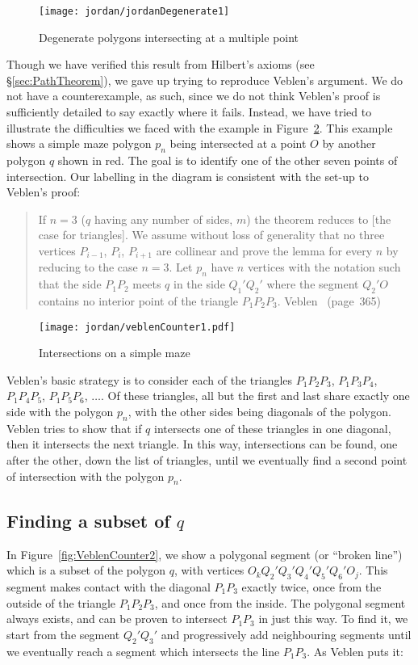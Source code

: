 \begin{figure}
\centering
\texttt{[image: jordan/jordanDegenerate1]}
\caption{Degenerate polygons intersecting at a multiple point}
\label{fig:jordanDegenerate1}
\end{figure}

Though we have verified this result from Hilbert's axioms (see \S\ref{sec:PathTheorem}), we gave up trying to reproduce Veblen's argument. We do not have a counterexample, as such, since we do not think Veblen's proof is sufficiently detailed to say exactly where it fails. Instead, we have tried to illustrate the difficulties we faced with the example in Figure~\ref{fig:VeblenCounter1}. This example shows a simple maze polygon $p_n$ being intersected at a point $O$ by another polygon $q$ shown in red. The goal is to identify one of the other seven points of intersection. Our labelling in the diagram is consistent with the set-up to Veblen's proof:

\begin{quotation}
If $n=3$ ($q$ having any number of sides, $m$) the theorem reduces to [the case for triangles]. We assume without loss of generality that no three vertices $P_{i-1}$, $P_i$, $P_{i+1}$ are collinear and prove the lemma for every $n$ by reducing to the case $n=3$. Let $p_n$ have $n$ vertices with the notation such that the side $P_1P_2$ meets $q$ in the side $Q_1'Q_2'$ where the segment $Q_2'O$ contains no interior point of the triangle $P_1P_2P_3$. Veblen~\cite{Veblenphd} (page~365)
\end{quotation}

\begin{figure}
\centering
\texttt{[image: jordan/veblenCounter1.pdf]}
\caption{Intersections on a simple maze}
\label{fig:VeblenCounter1}
\end{figure}

Veblen's basic strategy is to consider each of the triangles $P_1P_2P_3$, $P_1P_3P_4$, $P_1P_4P_5$, $P_1P_5P_6$, $\ldots$. Of these triangles, all but the first and last share exactly one side with the polygon $p_n$, with the other sides being diagonals of the polygon. Veblen tries to show that if $q$ intersects one of these triangles in one diagonal, then it intersects the next triangle. In this way, intersections can be found, one after the other, down the list of triangles, until we eventually find a second point of intersection with the polygon $p_n$.

\subsection{Finding a subset of $q$}\label{sec:SubsetOfQ}
In Figure~\ref{fig:VeblenCounter2}, we show a polygonal segment  (or ``broken line'') which is a subset of the polygon $q$, with vertices $O_kQ_2'Q_3'Q_4'Q_5'Q_6'O_j$. This segment makes contact with the diagonal $P_1P_3$ exactly twice, once from the outside of the triangle $P_1P_2P_3$, and once from the inside. The polygonal segment always exists, and can be proven to intersect $P_1P_3$ in just this way. To find it, we start from the segment $Q_2'Q_3'$ and progressively add neighbouring segments until we eventually reach a segment which intersects the line $P_1P_3$. As Veblen puts it:

